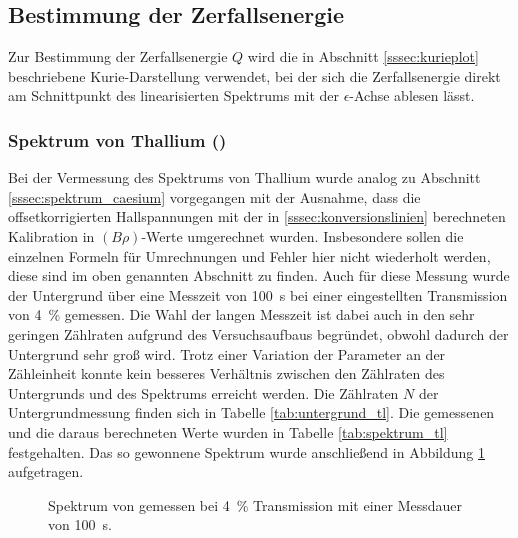 \documentclass[11pt, a4paper]{article}
\numberwithin{equation}{section}
\begin{document}
\subsection{Bestimmung der Zerfallsenergie}
Zur Bestimmung der Zerfallsenergie $Q$ wird die in Abschnitt \ref{sssec:kurieplot} beschriebene Kurie-Darstellung verwendet, bei der sich die Zerfallsenergie direkt am Schnittpunkt des linearisierten Spektrums mit der $\epsilon$-Achse ablesen lässt.

\subsubsection{Spektrum von Thallium ()}
\begin{table}
	\centering
	
	\caption{Untergrundmessung von  mit Messdauer \SI{100}{\second} bei \SI{4}{\percent} Transmission.}
	\label{tab:untergrund_tl}
\end{table}
Bei der Vermessung des Spektrums von Thallium wurde analog zu Abschnitt \ref{sssec:spektrum_caesium} vorgegangen mit der Ausnahme, dass die offsetkorrigierten Hallspannungen mit der in \ref{sssec:konversionslinien} berechneten Kalibration in $(B \rho)$-Werte umgerechnet wurden.
Insbesondere sollen die einzelnen Formeln für Umrechnungen und Fehler hier nicht wiederholt werden, diese sind im oben genannten Abschnitt zu finden.
Auch für diese Messung wurde der Untergrund über eine Messzeit von \SI{100}{\second} bei einer eingestellten Transmission von \SI{4}{\percent} gemessen.
Die Wahl der langen Messzeit ist dabei auch in den sehr geringen Zählraten aufgrund des Versuchsaufbaus begründet, obwohl dadurch der Untergrund sehr groß wird.
Trotz einer Variation der Parameter an der Zähleinheit konnte kein besseres Verhältnis zwischen den Zählraten des Untergrunds und des Spektrums erreicht werden.
Die Zählraten $N$ der Untergrundmessung finden sich in Tabelle \ref{tab:untergrund_tl}.
Die gemessenen und die daraus berechneten Werte wurden in Tabelle \ref{tab:spektrum_tl} festgehalten.
Das so gewonnene Spektrum wurde anschließend in Abbildung \ref{fig:thallium_spectrum} aufgetragen.
\begin{figure}[h]
	\centering
	
	\caption{Spektrum von  gemessen bei \SI{4}{\percent} Transmission mit einer Messdauer von \SI{100}{\second}.}
	\label{fig:thallium_spectrum}
\end{figure}
\end{document}
